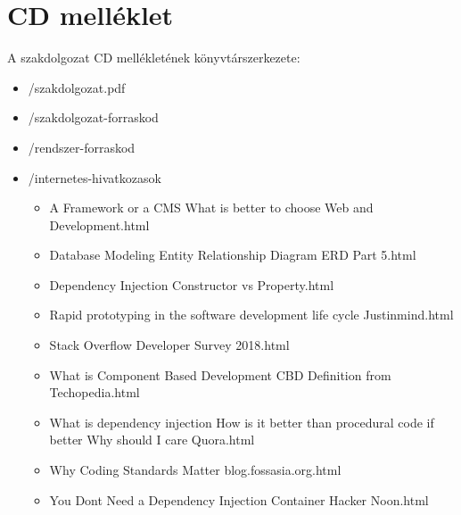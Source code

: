 \documentclass[a4paper,12pt,oneside]{report}
\begin{document}
\newpage

\sectionfont{\rmfamily\bfseries\large}
\thispagestyle{empty}
\section{CD melléklet}

A szakdolgozat CD mellékletének könyvtárszerkezete:

\begin{itemize}
	\item[] /szakdolgozat.pdf
	\item[] /szakdolgozat-forraskod
	\item[] /rendszer-forraskod
	\item[] /internetes-hivatkozasok
        \begin{itemize}
            \item[] A Framework or a CMS What is better to choose Web and Development.html
            \item[] Database Modeling Entity Relationship Diagram ERD Part 5.html
            \item[] Dependency Injection Constructor vs Property.html
            \item[] Rapid prototyping in the software development life cycle Justinmind.html
            \item[] Stack Overflow Developer Survey 2018.html
            \item[] What is Component Based Development CBD Definition from Techopedia.html
            \item[] What is dependency injection How is it better than procedural code if better Why should I care Quora.html
            \item[] Why Coding Standards Matter blog.fossasia.org.html
            \item[] You Dont Need a Dependency Injection Container Hacker Noon.html
		\end{itemize}
\end{itemize}
\end{document}
